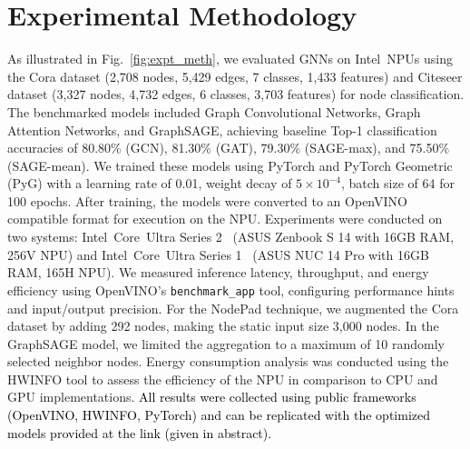 \section{Experimental Methodology}\label{sec:expt_methodology}
As illustrated in Fig.~\ref{fig:expt_meth}, we evaluated GNNs on Intel\textregistered\ NPUs using the Cora dataset (2,708 nodes, 5,429 edges, 7 classes, 1,433 features) and Citeseer dataset (3,327 nodes, 4,732 edges, 6 classes, 3,703 features) for node classification. The benchmarked models included Graph Convolutional Networks, Graph Attention Networks, and GraphSAGE, achieving baseline Top-1 classification accuracies of 80.80\% (GCN), 81.30\% (GAT), 79.30\% (SAGE-max), and 75.50\% (SAGE-mean). We trained these models using PyTorch and PyTorch Geometric (PyG) with a learning rate of 0.01, weight decay of $5 \times 10^{-4}$, batch size of 64 for 100 epochs. After training, the models were converted to an OpenVINO  \cite{openvino} compatible format for execution on the NPU. Experiments were conducted on two systems: Intel\textregistered\ Core\texttrademark\ Ultra Series 2~\cite{lnl} (ASUS Zenbook S 14 with 16GB RAM, 256V NPU) and Intel\textregistered\ Core\texttrademark\ Ultra Series 1~\cite{mtl} (ASUS NUC 14 Pro with 16GB RAM, 165H NPU). We measured inference latency, throughput, and energy efficiency using OpenVINO’s \texttt{benchmark\_app} tool, configuring performance hints and input/output precision. For the NodePad technique, we augmented the Cora dataset by adding 292 nodes, making the static input size 3,000 nodes. In the GraphSAGE model, we limited the aggregation to a maximum of 10 randomly selected neighbor nodes. Energy consumption analysis was conducted using the HWINFO tool to assess the efficiency of the NPU in comparison to CPU and GPU implementations.
\textcolor{black}{All results were collected using public frameworks (OpenVINO, HWINFO, PyTorch) and can be replicated with the optimized models provided at the link (given in abstract).}


